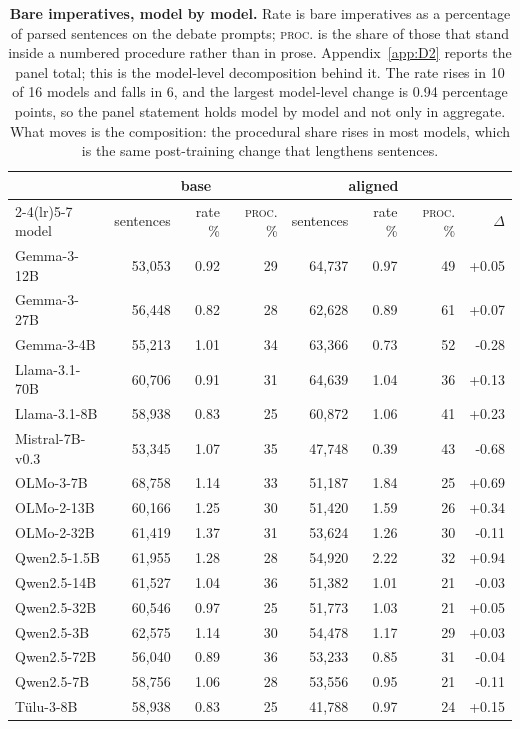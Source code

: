\begin{table}[tb]\centering\small
\caption{\textbf{Bare imperatives, model by model.} Rate is bare imperatives as a percentage of parsed sentences on the debate prompts; \textsc{proc.} is the share of those that stand inside a numbered procedure rather than in prose. Appendix~\ref{app:D2} reports the panel total; this is the model-level decomposition behind it. The rate rises in 10 of 16 models and falls in 6, and the largest model-level change is 0.94 percentage points, so the panel statement holds model by model and not only in aggregate. What moves is the composition: the procedural share rises in most models, which is the same post-training change that lengthens sentences.}
\label{tab:imperative}
\begin{tabular}{lrrr@{\hspace{10pt}}rrr@{\hspace{10pt}}r}
\toprule
 & \multicolumn{3}{c}{base} & \multicolumn{3}{c}{aligned} & \\
\cmidrule(lr){2-4}\cmidrule(lr){5-7}
model & sentences & rate \% & \textsc{proc.} \% & sentences & rate \% & \textsc{proc.} \% & $\Delta$ \\
\midrule
Gemma-3-12B & 53{,}053 & 0.92 & 29 & 64{,}737 & 0.97 & 49 & +0.05 \\
Gemma-3-27B & 56{,}448 & 0.82 & 28 & 62{,}628 & 0.89 & 61 & +0.07 \\
Gemma-3-4B & 55{,}213 & 1.01 & 34 & 63{,}366 & 0.73 & 52 & -0.28 \\
Llama-3.1-70B & 60{,}706 & 0.91 & 31 & 64{,}639 & 1.04 & 36 & +0.13 \\
Llama-3.1-8B & 58{,}938 & 0.83 & 25 & 60{,}872 & 1.06 & 41 & +0.23 \\
Mistral-7B-v0.3 & 53{,}345 & 1.07 & 35 & 47{,}748 & 0.39 & 43 & -0.68 \\
OLMo-3-7B & 68{,}758 & 1.14 & 33 & 51{,}187 & 1.84 & 25 & +0.69 \\
OLMo-2-13B & 60{,}166 & 1.25 & 30 & 51{,}420 & 1.59 & 26 & +0.34 \\
OLMo-2-32B & 61{,}419 & 1.37 & 31 & 53{,}624 & 1.26 & 30 & -0.11 \\
Qwen2.5-1.5B & 61{,}955 & 1.28 & 28 & 54{,}920 & 2.22 & 32 & +0.94 \\
Qwen2.5-14B & 61{,}527 & 1.04 & 36 & 51{,}382 & 1.01 & 21 & -0.03 \\
Qwen2.5-32B & 60{,}546 & 0.97 & 25 & 51{,}773 & 1.03 & 21 & +0.05 \\
Qwen2.5-3B & 62{,}575 & 1.14 & 30 & 54{,}478 & 1.17 & 29 & +0.03 \\
Qwen2.5-72B & 56{,}040 & 0.89 & 36 & 53{,}233 & 0.85 & 31 & -0.04 \\
Qwen2.5-7B & 58{,}756 & 1.06 & 28 & 53{,}556 & 0.95 & 21 & -0.11 \\
T\"ulu-3-8B & 58{,}938 & 0.83 & 25 & 41{,}788 & 0.97 & 24 & +0.15 \\
\bottomrule
\end{tabular}
\end{table}
